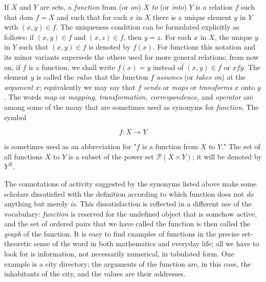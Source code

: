 
If $X$ and $Y$ are sets, a \textit{function} from (or \textit{on}) $X$ \textit{to} (or \textit{into}) $Y$ is a relation $f$ such that dom $f = X$ and such that for each $x$ in $X$ there is a unique element $y$ in $Y$ with $(x, y) \in f$. The uniqueness condition can be formulated explicitly as follows: if $(x, y) \in f$ and $(x, z) \in f$, then $y = z$. For each $x$ in $X$, the unique $y$ in $Y$ such that $(x, y) \in f$ is denoted by $f(x)$. For functions this notation and its minor variants supersede the others used for more general relations; from now on, if $f$ is a function, we shall write $f(x) = y$ instead of $(x, y) \in f$ or $x f y$. The element $y$ is called the \textit{value} that the function $f$ \textit{assumes} (or \textit{takes on}) at the \textit{argument} $x$; equivalently we may say that $f$ \textit{sends} or \textit{maps} or \textit{transforms} $x$ onto $y$. The words \textit{map} or \textit{mapping, transformation, correspondence,} and \textit{operator} are among some of the many that are sometimes used as synonyms for \textit{function}. The symbol

\begin{equation*}
f: X \rightarrow Y
\end{equation*}

is sometimes used as an abbreviation for "$f$ is a function from $X$ to $Y$." The set of all functions $X$ to $Y$ is a subset of the power set $\mathcal{P}(X \times Y)$; it will be denoted by $Y^{X}$. 

The connotations of activity suggested by the synonyms listed above make some scholars dissatisfied with the definition according to which function does not \textit{do} anything but merely \textit{is}. This dissatisfaction is reflected in a different use of the vocabulary: \textit{function} is reserved for the undefined object that is somehow active, and the set of ordered pairs that we have called the function is then called the \textit{graph} of the function. It is easy to find examples of functions in the precise set-theoretic sense of the word in both mathematics and everyday life; all we have to look for is information, not necessarily numerical, in tabulated form. One example is a city directory; the arguments of the function are, in this case, the inhabitants of the city, and the values are their addresses. 

